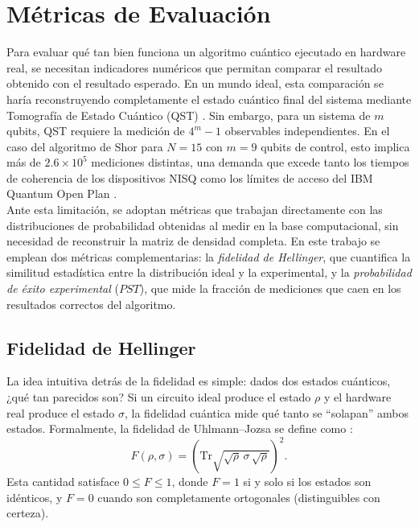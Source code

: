 \documentclass[12pt, spanish]{book}
\begin{document}
\section{Métricas de Evaluación}
\label{sec:metricas_evaluacion}

Para evaluar qué tan bien funciona un algoritmo cuántico ejecutado en hardware real, se necesitan indicadores numéricos que permitan comparar el resultado obtenido con el resultado esperado. En un mundo ideal, esta comparación se haría reconstruyendo completamente el estado cuántico final del sistema mediante Tomografía de Estado Cuántico (QST) \cite{Nielsen2024}. Sin embargo, para un sistema de $m$ qubits, QST requiere la medición de $4^m - 1$ observables independientes. En el caso del algoritmo de Shor para $N=15$ con $m = 9$ qubits de control, esto implica más de $2.6 \times 10^5$ mediciones distintas, una demanda que excede tanto los tiempos de coherencia de los dispositivos NISQ como los límites de acceso del IBM Quantum Open Plan \cite{IBM20251}.\\

Ante esta limitación, se adoptan métricas que trabajan directamente con las distribuciones de probabilidad obtenidas al medir en la base computacional, sin necesidad de reconstruir la matriz de densidad completa. En este trabajo se emplean dos métricas complementarias: la \textit{fidelidad de Hellinger}, que cuantifica la similitud estadística entre la distribución ideal y la experimental, y la \textit{probabilidad de éxito experimental} ($PST$), que mide la fracción de mediciones que caen en los resultados correctos del algoritmo.

\subsection{Fidelidad de Hellinger}

La idea intuitiva detrás de la fidelidad es simple: dados dos estados cuánticos, ¿qué tan parecidos son? Si un circuito ideal produce el estado $\rho$ y el hardware real produce el estado $\sigma$, la fidelidad cuántica mide qué tanto se ``solapan'' ambos estados. Formalmente, la fidelidad de Uhlmann--Jozsa se define como \cite{Fuchs1995, Nielsen2024}:
\begin{equation}
    F(\rho, \sigma) = \left( \mathrm{Tr} \sqrt{\sqrt{\rho}\,\sigma\,\sqrt{\rho}} \right)^2.
    \label{eq:fidelidad_uhlmann}
\end{equation}
Esta cantidad satisface $0 \leq F \leq 1$, donde $F = 1$ si y solo si los estados son idénticos, y $F = 0$ cuando son completamente ortogonales (distinguibles con certeza).\\
\end{document}
